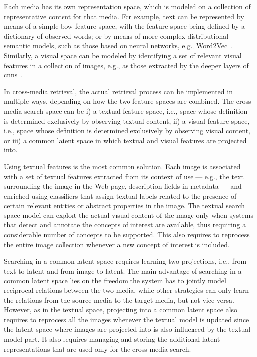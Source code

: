 Each media has its own representation space, which is modeled on a collection of representative content for that media.
For example, text can be represented by means of a simple \acrlong{bow} feature space, with the feature space being defined by a dictionary of observed words; or by means of more complex distributional semantic models, such as those based on neural networks, e.g., Word2Vec~\cite{mikolov2013distributed}.
Similarly, a visual space can be modeled by identifying a set of relevant visual features in a collection of images, e.g., as those extracted by the deeper layers of \glspl{cnn}~\cite{krizhevsky2012imagenet}.

In cross-media retrieval, the actual retrieval process can be implemented in multiple ways, depending on how the two feature spaces are combined.
The cross-media search space can be %
i) a textual feature space, i.e., space whose definition is determined exclusively by observing textual content, %
ii) a visual feature space, i.e., space whose definition is determined exclusively by observing visual content, or %
iii) a common latent space in which textual and visual features are projected into.

Using textual features is the most common solution. %
Each image is associated with a set of textual features extracted from its context of use --- e.g., the text surrounding the image in the Web page, description fields in metadata --- and enriched using classifiers that assign textual labels related to the presence of certain relevant entities or abstract properties in the image.
The textual search space model can exploit the actual visual content of the image only when systems that detect and annotate the concepts of interest are available, thus requiring a considerable number of concepts to be supported.
This also requires to reprocess the entire image collection whenever a new concept of interest is included.

Searching in a common latent space requires learning two projections, i.e., from text-to-latent and from image-to-latent.
The main advantage of searching in a common latent space lies on the freedom the system has to jointly model reciprocal relations between the two media, while other strategies can only learn the relations from the source media to the target media, but not vice versa.
However, as in the textual space, projecting into a common latent space also requires to reprocess all the images whenever the textual model is updated since the latent space where images are projected into is also influenced by the textual model part.
It also requires managing and storing the additional latent representations that are used only for the cross-media search.

